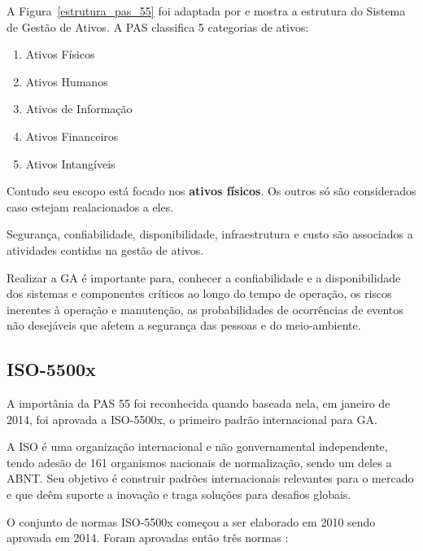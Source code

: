 A Figura~\ref{estrutura_pas_55} foi adaptada por \cite{valeria2013} e mostra a estrutura do Sistema de Gestão de Ativos. A PAS classifica 5 categorias de ativos:

\begin{enumerate}
	\item{Ativos Físicos}
	\item{Ativos Humanos}
	\item{Ativos de Informação}
	\item{Ativos Financeiros}
	\item{Ativos Intangíveis}
\end{enumerate}

Contudo seu escopo está focado nos \textbf{ativos físicos}. Os outros só são considerados caso estejam realacionados a eles.

Segurança, confiabilidade, disponibilidade, infraestrutura e custo são associados a atividades contidas na gestão de ativos. 

Realizar a GA é importante para, conhecer a confiabilidade e a disponibilidade dos sistemas e componentes críticos ao longo do tempo de operação, os riscos inerentes à operação e manutenção, as probabilidades de ocorrências de eventos não desejáveis que afetem a segurança das pessoas e do meio-ambiente.


\subsection{ISO-5500x}

A importânia da PAS 55 foi reconhecida quando baseada nela, em janeiro de 2014, foi aprovada a ISO-5500x, o primeiro padrão internacional para GA. 

A ISO é uma organização internacional e não gonvernamental independente, tendo adesão de 161 organismos nacionais de normalização, sendo um deles a ABNT. Seu objetivo é construir padrões internacionais relevantes para o mercado e que deêm suporte a inovação e traga soluções para desafios globais.

O conjunto de normas ISO-5500x começou a ser elaborado em 2010 sendo aprovada em 2014. Foram aprovadas então três normas \cite{abraman}:

